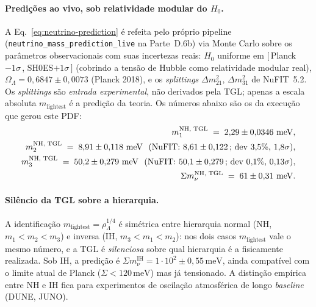 \documentclass[12pt,a4paper]{article}
\newcommand{\TGL}{\textsc{TGL}}
\begin{document}
\paragraph{Predições ao vivo, sob relatividade modular do $H_0$.}
A Eq.~\eqref{eq:neutrino-prediction} é refeita pelo próprio pipeline
(\texttt{neutrino\_mass\_prediction\_live} na Parte~D.6b) via Monte Carlo
sobre os parâmetros observacionais com suas incertezas reais:
$H_0$ uniforme em $[\,$Planck${-}1\sigma\,$, SH0ES${+}1\sigma\,]$
(cobrindo a tensão de Hubble como relatividade modular real),
$\Omega_\Lambda = 0{,}6847 \pm 0{,}0073$ (Planck 2018), e os \emph{splittings}
$\Delta m^2_{21}$, $\Delta m^2_{31}$ de NuFIT~5.2.  Os \emph{splittings} são
\emph{entrada experimental}, não derivados pela \TGL{}; apenas a escala
absoluta $m_{\text{lightest}}$ é a predição da teoria.  Os números abaixo
são os da execução que gerou este PDF:
\begin{align}
m_1^{\text{NH, TGL}} \;=\; 2{,}29 \pm 0{,}0346\ \mathrm{meV}, \notag\\
m_2^{\text{NH, TGL}} \;=\; 8{,}91 \pm 0{,}118\ \mathrm{meV}\ \ \text{(NuFIT: }8{,}61 \pm 0{,}122\,\text{; dev }3{,}5\%\text{,}\ 1{,}8\sigma\text{)}, \notag\\
m_3^{\text{NH, TGL}} \;=\; 50{,}2 \pm 0{,}279\ \mathrm{meV}\ \ \text{(NuFIT: }50{,}1 \pm 0{,}279\,\text{; dev }0{,}1\%\text{,}\ 0{,}13\sigma\text{)}, \notag\\
\Sigma m_\nu^{\text{NH, TGL}} \;=\; 61 \pm 0{,}31\ \mathrm{meV}.
\label{eq:neutrino-numbers}
\end{align}

\paragraph{Silêncio da TGL sobre a hierarquia.}
A identificação $m_{\text{lightest}} = \rho_\Lambda^{1/4}$ é simétrica entre
hierarquia normal (NH, $m_1 < m_2 < m_3$) e inversa (IH, $m_3 < m_1 < m_2$):
nos dois casos $m_{\text{lightest}}$ vale o mesmo número, e a \TGL{} é
\emph{silenciosa} sobre qual hierarquia é a fisicamente realizada.  Sob IH,
a predição é $\Sigma m_\nu^{\text{IH}} = 1 \cdot 10^{2} \pm 0{,}55\,\mathrm{meV}$, ainda compatível com o
limite atual de Planck ($\Sigma < 120\,\mathrm{meV}$) mas já tensionado.  A
distinção empírica entre NH e IH fica para experimentos de oscilação
atmosférica de longo \emph{baseline} (DUNE, JUNO).
\end{document}
